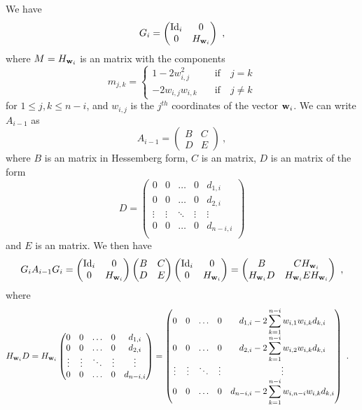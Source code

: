 We have
\[
G_i =
\begin{pmatrix}
\operatorname{Id}_{i} & 0 \\
0 & H_{\mathbf{w}_i}
\end{pmatrix}
\  ,
\]
where $M=H_{\mathbf{w}_i}$ is an  matrix with the components
\[
m_{j,k} =
\begin{cases}
1-2w_{i,j}^2 & \quad \text{if} \quad j=k \\
- 2 w_{i,j}w_{i,k} & \quad \text{if} \quad j\neq k
\end{cases}
\]
for $1\leq j,k\leq n-i$, and $w_{i,j}$ is the $j^{th}$ coordinates of
the vector $\mathbf{w}_i$.  We can write $A_{i-1}$ as
\[
A_{i-1} = 
\begin{pmatrix}
B & C \\
D & E
\end{pmatrix} \ ,
\]
where $B$ is an  matrix in Hessemberg form, $C$ is an
 matrix, $D$ is an  matrix of the form
\[
D =
\begin{pmatrix}
0 & 0 & \ldots & 0 & d_{1,i} \\
0 & 0 & \ldots & 0 & d_{2,i} \\
\vdots & \vdots & \ddots & \vdots & \vdots \\
0 & 0 & \ldots & 0 & d_{n-i,i} \\
\end{pmatrix}
\]
and $E$ is an  matrix.  We then have
\[
G_i A_{i-1} G_i =
\begin{pmatrix}
\operatorname{Id}_i & 0 \\
0 & H_{\mathbf{w}_i}
\end{pmatrix}
\begin{pmatrix}
B & C \\
D & E
\end{pmatrix}
\begin{pmatrix}
\operatorname{Id}_i & 0 \\
0 & H_{\mathbf{w}_i}
\end{pmatrix}
=
\begin{pmatrix}
B & C H_{\mathbf{w}_i} \\
H_{\mathbf{w}_i} D & H_{\mathbf{w}_i} E H_{\mathbf{w}_i}
\end{pmatrix} \ ,
\]
where
\begin{align*}
H_{\mathbf{w}_i} D &=
H_{\mathbf{w}_i}
\begin{pmatrix}
0 & 0 & \ldots & 0 & d_{1,i} \\
0 & 0 & \ldots & 0 & d_{2,i} \\
\vdots & \vdots & \ddots & \vdots & \vdots \\
0 & 0 & \ldots & 0 & d_{n-i,i}
\end{pmatrix}
=
\begin{pmatrix}
0 & 0 & \ldots & 0 & \displaystyle
d_{1,i} - 2 \sum_{k=1}^{n-i} w_{i,1}w_{i,k}d_{k,i} \\
0 & 0 & \ldots & 0 & \displaystyle
d_{2,i} - 2 \sum_{k=1}^{n-i} w_{i,2}w_{i,k}d_{k,i} \\
\vdots & \vdots & \ddots & \vdots & \vdots \\
0 & 0 & \ldots & 0 & \displaystyle
d_{n-i,i} - 2 \sum_{k=1}^{n-i} w_{i,n-i}w_{i,k}d_{k,i}
\end{pmatrix} \ .
\end{align*}
